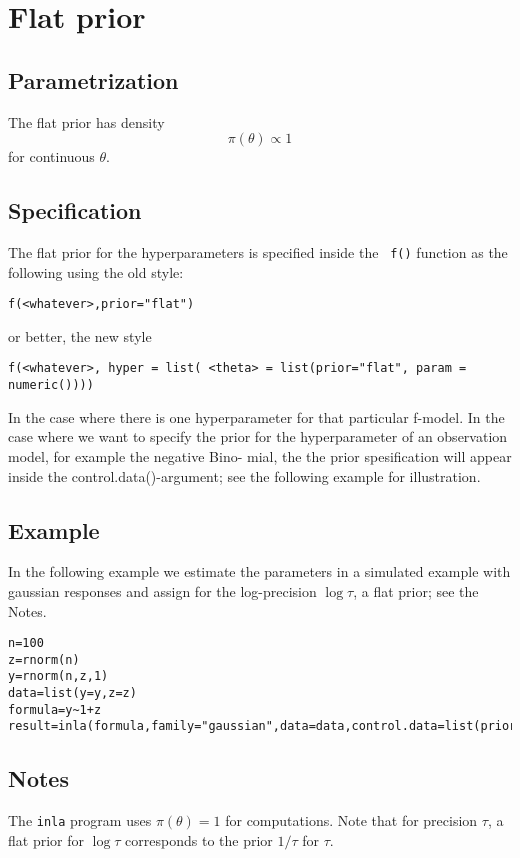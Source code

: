 \documentclass[a4paper,11pt]{article}
\begin{document}
\section*{ Flat prior}

\subsection*{Parametrization}
The flat prior has density
\begin{equation}
\pi(\theta)\propto 1
\end{equation}
for continuous $\theta$.
 
\subsection*{Specification}
The flat prior for the hyperparameters is specified inside the {\tt
    f()} function as the following using the old style:
\begin{center}
    {\tt f(<whatever>,prior="flat")}
\end{center}
or better, the new style
\begin{center}
    {\tt f(<whatever>, hyper = list( <theta> = list(prior="flat",
        param = numeric())))}
\end{center}
In the case where there is one hyperparameter for that particular
f-model. In the case where we want to specify the prior for the
hyperparameter of an observation model, for example the negative Bino-
mial, the the prior spesification will appear inside the
control.data()-argument; see the following example for illustration.

\subsection*{Example}

In the following example we estimate the parameters in a simulated
example with gaussian responses and assign for the log-precision
$\log\tau$, a flat prior; see the Notes.
\begin{verbatim}
n=100
z=rnorm(n)
y=rnorm(n,z,1)
data=list(y=y,z=z)
formula=y~1+z
result=inla(formula,family="gaussian",data=data,control.data=list(prior="flat"))
\end{verbatim}

\subsection*{Notes}

The {\tt inla} program uses $\pi(\theta)=1$ for computations.  Note
that for precision $\tau$, a flat prior for $\log\tau$ corresponds to
the prior $1/\tau$ for $\tau$.
\end{document}
